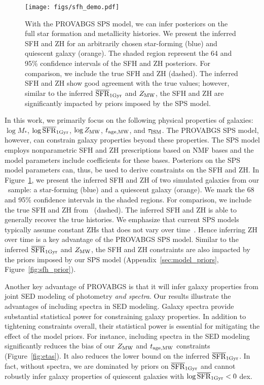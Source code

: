 \begin{figure}
\begin{center}
\texttt{[image: figs/sfh\_demo.pdf]}
    \caption{
        With the {\sc PROVABGS} SPS model, we can infer posteriors on the full
        star formation and metallicity histories. 
        We present the inferred SFH and ZH for an arbitrarily chosen
        star-forming (blue) and quiescent galaxy (orange).
        The shaded region represent the 64 and 95\% confidence intervals of the
        SFH and ZH posteriors. 
        For comparison, we include the true SFH and ZH (dashed). 
        The inferred SFH and ZH show good agreement with the true values;
        however, similar to the inferred $\overline{\rm SFR}_{\rm 1Gyr}$ and $Z_{\rm MW}$, the SFH and ZH
        are significantly impacted by priors imposed by the SPS model. 
    } \label{fig:sfh_demo}
\end{center}
\end{figure}
In this work, we primarily focus on the following physical properties of
galaxies: $\log M_*$, $\log\overline{\rm SFR}_{\rm 1Gyr}$, $\log Z_{\rm MW}$, $t_{\rm age, MW}$, and $\tau_{\rm ISM}$. 
The {\sc PROVABGS} SPS model, however, can constrain galaxy properties beyond
these properties. 
The SPS model employs nonparametric SFH and ZH prescriptions based on NMF bases
and the model parameters include coefficients for these bases. 
Posteriors on the SPS model parameters can, thus, be used to derive constraints
on the SFH and ZH. 
In Figure~\ref{fig:sfh_demo}, we present the inferred SFH and ZH of two
simulated galaxies from our \lgal~sample: a star-forming (blue) and a quiescent
galaxy (orange). 
We mark the 68 and 95\% confidence intervals in the shaded regions. 
For comparison, we include the true SFH and ZH from \lgal~(dashed).  
The inferred SFH and ZH is able to generally recover the true histories. 
We emphasize that current SPS models typically assume constant ZHs that does
not vary over time~\citep{carnall2017, leja2019}. 
Hence inferring ZH over time is a key advantage of the {\sc PROVABGS} SPS
model. 
Similar to the inferred $\overline{\rm SFR}_{\rm 1Gyr}$ and $Z_{\rm MW}$, the SFH and ZH constraints are
also impacted by the priors imposed by our SPS model
(Appendix~\ref{sec:model_priors}, Figure~\ref{fig:sfh_prior}).

Another key advantage of {\sc PROVABGS} is that it will infer galaxy
properties from joint SED modeling of photometry \emph{and spectra}. 
Our results illustrate the advantages of including spectra in SED modeling. 
Galaxy spectra provide substantial statistical power for constraining 
galaxy properties. 
In addition to tightening constraints overall, their statistical power is
essential for mitigating the effect of the model priors. 
For instance, including spectra in the SED modeling significantly reduces the
bias of our $Z_{\rm MW}$ and $t_{\rm age, MW}$ constraints (Figure~\ref{fig:etas}). 
It also reduces the lower bound on the inferred $\overline{\rm SFR}_{\rm 1Gyr}$. 
In fact, without spectra, we are dominated by priors on $\overline{\rm SFR}_{\rm 1Gyr}$ and cannot
robustly infer galaxy properties of quiescent galaxies with $\log\overline{\rm SFR}_{\rm 1Gyr} < 0$
dex.

